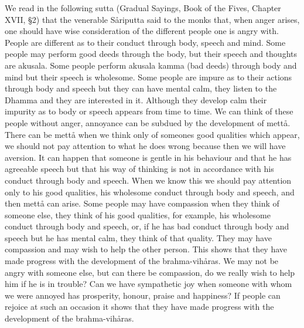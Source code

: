 \documentclass[12pt,twoside]{article}
\begin{document}
We read in the following sutta (Gradual Sayings, Book of the Fives,
Chapter XVII, {\S}2) that the venerable S{\aa}riputta said to the monks
that, when anger arises, one should have wise consideration of the
different people one is angry with. People are different as to their
conduct through body, speech and mind. Some people may perform good
deeds through the body, but their speech and thoughts are akusala. Some
people perform akusala kamma (bad deeds) through body and mind but
their speech is wholesome. Some people are impure as to their actions
through body and speech but they can have mental calm, they listen to
the Dhamma and they are interested in it. Although they develop calm
their impurity as to body or speech appears from time to time. We can
think of these people without anger, annoyance can be subdued by the
development of mett{\aa}. There can be mett{\aa} when we think only of
someone{\textquotesingle}s good qualities which appear, we should not
pay attention to what he does wrong because then we will have aversion.
It can happen that someone is gentle in his behaviour and that he has
agreeable speech but that his way of thinking is not in accordance with
his conduct through body and speech. When we know this we should pay
attention only to his good qualities, his wholesome conduct through
body and speech, and then mett{\aa} can arise. Some people may have
compassion when they think of someone else, they think of his good
qualities, for example, his wholesome conduct through body and speech,
or, if he has bad conduct through body and speech but he has mental
calm, they think of that quality. They may have compassion and may wish
to help the other person. This shows that they have made progress with
the development of the brahma{}-vih{\aa}ras. We may not be angry with
someone else, but can there be compassion, do we really wish to help
him if he is in trouble? Can we have sympathetic joy when someone with
whom we were annoyed has prosperity, honour, praise and happiness? If
people can rejoice at such an occasion it shows that they have made
progress with the development of the brahma{}-vih{\aa}ras. 


\bigskip
\end{document}
